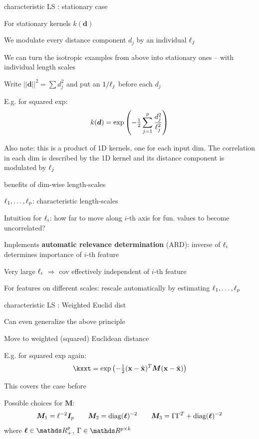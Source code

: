 \documentclass[11pt,compress,t,notes=noshow, xcolor=table]{beamer}
\begin{document}
\begin{framei}[sep=M]{characteristic LS : stationary case}
\item For stationary kernels $k(\bm{d})$ 
\item We modulate every distance component $d_j$ by an individual $\ell_j$
\item We can turn the isotropic examples from above into 
stationary ones -- with individual length scales
\item Write $||\bm{d}||^2 = \sum d_j^2$ and put an $1/\ell_j$ before each $d_j$
\item E.g. for squared exp:
$$
  k(\bm{d}) = \exp \left(- \tfrac{1}{2} \sum\limits_{j=1}^p \frac{d_j^2}{\ell_j^2} \right)
$$
\item Also note: this is a product of 1D kernels, one for each input dim. The correlation in each dim is described by the 1D kernel and its distance component is modulated by $\ell_j$
\end{framei}


\begin{framei}[sep=L]{benefits of dim-wise length-scales}
\item $\ell_1,\dots, \ell_p$: characteristic length-scales
\item Intuition for $\ell_i$: how far to move along $i$-th axis for fun. values to become uncorrelated?
\item Implements \textbf{automatic relevance determination} (ARD): inverse of $\ell_i$ determines importance of $i$-th feature
\item Very large $\ell_i$ $\Rightarrow$ cov effectively independent of $i$-th feature
\item For features on different scales: rescale automatically by estimating $\ell_1,\dots, \ell_p$ 
\end{framei}



\begin{framei}[sep=M]{characteristic LS : Weighted Euclid dist}

\item Can even generalize the above principle
\item Move to weighted (squared) Euclidean distance
\item E.g. for squared exp again: 
$$
\kxxt = \exp \left(- \tfrac{1}{2}(\xv - \xtil)^T\bm{M} (\xv - \xtil )\right)
$$
\item This covers the case before
\item Possible choices for $\bm{M}$:
$$
\bm{M}_1 = \ell^{-2}\boldsymbol{I}_p \qquad \bm{M}_2 = \operatorname{diag}(\bm{\ell})^{-2} \qquad \bm{M}_3 = \Gamma \Gamma^T + \operatorname{diag}(\bm{\ell})^{-2}
$$
where $\bm{\ls} \in \R^p_+$, $\Gamma \in \R^{p \times k}$ 
\end{framei}
\end{document}
